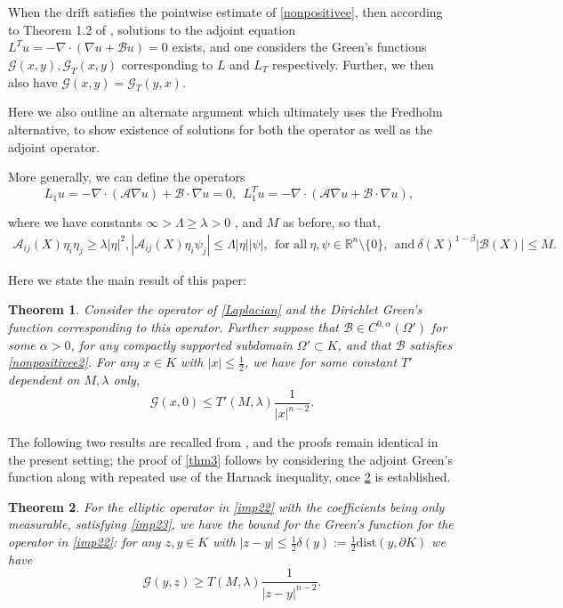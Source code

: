 \documentclass{article}
\theoremstyle{plain}
\newtheorem{theorem}{Theorem}
\theoremstyle{definition}
\theoremstyle{plain}
\newcommand{\R}{\mathbb{R}}
\newcommand{\A}{\mathcal{A}}
\newcommand{\B}{\mathcal{B}}
\newcommand{\G}{\mathcal{G}}
\begin{document}
     When the drift satisfies the pointwise estimate of \cref{nonpositivee}, then according to Theorem 1.2 of \cite{Ha24}, solutions to the adjoint equation $L^{T} u=-\nabla\cdot(\nabla u+\B u)=0$ exists, and one considers the Green's functions $\G(x,y),\G_T (x,y)$  corresponding to $L$ and $L_T$ respectively. Further, we then also have $\G(x,y)=\G_T(y,x)$. 

Here we also outline an alternate argument which ultimately uses the Fredholm alternative, to show existence of solutions for both the operator as well as the adjoint operator. 

More generally, we can define the operators
\begin{equation}\label{imp22}
    L_1 u=-\nabla\cdot(\A\nabla u) +\B\cdot \nabla u =0,\ \ L_{1}^{T} u=-\nabla\cdot(\A\nabla u +\B\cdot \nabla u),  \ \   
\end{equation}

where we have constants $\infty> \Lambda\geq \lambda>0$ , and $M$ as before, so that, 
\begin{align}\label{imp23}
    \A_{ij}(X) \eta_i \eta_j \geq \lambda |\eta|^2, |\A_{ij}(X)\eta_i \psi_j|\leq \Lambda |\eta| |\psi|, \ \ \text{for all} \ \eta,\psi\in \R^{n}\setminus \{0\}, \ \ \text{and} \ \delta(X)^{1-\beta}|\B(X)|\leq M.
\end{align}


Here we state the main result of this paper:

\begin{theorem}\label{thm2}
    Consider the operator of \cref{Laplacian} and the Dirichlet Green's function corresponding to this operator. Further suppose that $\B\in C^{0,\alpha}(\Omega')$ for some $\alpha>0$, for any compactly supported subdomain  $\Omega'\subset K$, and that $\B$ satisfies  \cref{nonpositivee2}.  For any $x\in K$ with $|x|\leq \frac{1}{2}$, we have for some constant $T'$ dependent on $M, \lambda$ only,
    \begin{equation}
        \G(x,0)\leq T'(M,\lambda)\frac{1}{|x|^{n-2}}.
    \end{equation}
\end{theorem}

The following two results are recalled from \cite{Pat25}, and the proofs remain identical in the present setting; the proof of \cref{thm3} follows by considering the adjoint Green's function along with repeated use of the Harnack inequality, once \cref{thm1} is established.

\begin{theorem}\label{thm1}
    For the elliptic operator in \cref{imp22} with the coefficients being only measurable, satisfying \cref{imp23}, we have the bound for the Green's function for the operator in \cref{imp22}: for any $z,y\in K$ with $|z-y|\leq \frac{1}{2}\delta(y):=\frac{1}{2}\text{dist}(y,\partial K)$ we have 
    \begin{equation}\label{lower}
        \G(y,z)\geq T(M,\lambda)\frac{1}{|z-y|^{n-2}}.
    \end{equation}
\end{theorem} 
\end{document}
